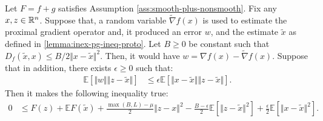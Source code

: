 \documentclass[12pt]{article}
\newcommand{\expect}{\ensuremath{\mathbb E}}
\begin{document}
        \begin{lemma}\label{lemma:stoch-pg-ineq}
            Let $F = f + g$ satisfies Assumption \ref{ass:smooth-plus-nonsmooth}. 
            Fix any $x, z \in \mathbb R^n$. 
            Suppose that, a random variable $\tilde \nabla f(x)$ is used to estimate the proximal gradient operator and, it produced an error $w$, and the estimate $\tilde x$ as defined in \ref{lemma:inex-pg-ineq-proto}. 
            Let $B \ge 0$ be constant such that $D_f(\tilde x,x)\le B/2 \Vert x - \tilde x\Vert^2$. 
            Then, it would have $w = \nabla f(x) - \tilde \nabla f(x)$. 
            Suppose that in addition, there exists $\epsilon \ge 0$ such that: 
            \begin{align*}
                \expect \left[
                    \Vert w\Vert \Vert z - \tilde x\Vert
                \right] &\le 
                \epsilon \expect \left[
                    \Vert x - \tilde x\Vert\Vert z - \tilde x\Vert
                \right]. 
            \end{align*}
            Then it makes the following inequality true: 
            \begin{align*}
                0 &\le 
                F(z) + \expect F(\tilde x) + \frac{\max(B, L) - \mu}{2} \Vert z - x\Vert^2
                - \frac{B - \epsilon}{2}\expect\left[\Vert z - \tilde x\Vert^2\right]
                + \frac{\epsilon}{2} \expect\left[\Vert x - \tilde x\Vert^2\right]. 
            \end{align*}
        \end{lemma}
\end{document}
